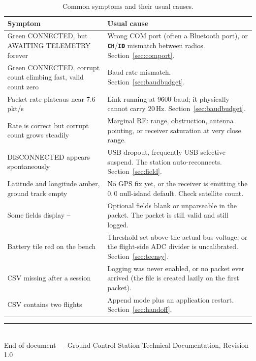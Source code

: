 \documentclass[11pt,a4paper]{article}
\newcommand{\code}[1]{\texttt{#1}}
\newcommand{\param}[1]{\textbf{\texttt{#1}}}
\begin{document}
\begin{table}[htbp]
\centering
\caption{Common symptoms and their usual causes.}
\label{tab:symptoms}
\small
\begin{tabularx}{\textwidth}{@{}p{52mm}X@{}}
\toprule
\textbf{Symptom} & \textbf{Usual cause}\\
\midrule
Green \textsf{CONNECTED}, but \textsf{AWAITING TELEMETRY} forever & Wrong COM port (often a Bluetooth port), or \param{CH}/\param{ID} mismatch between radios. Section~\ref{sec:comport}.\\
Green \textsf{CONNECTED}, corrupt count climbing fast, valid count zero & Baud rate mismatch. Section~\ref{sec:baudbudget}.\\
Packet rate plateaus near 7.6\,pkt/s & Link running at 9600 baud; it physically cannot carry 20\,Hz. Section~\ref{sec:baudbudget}.\\
Rate is correct but corrupt count grows steadily & Marginal RF: range, obstruction, antenna pointing, or receiver saturation at very close range.\\
\textsf{DISCONNECTED} appears spontaneously & USB dropout, frequently USB selective suspend. The station auto-reconnects. Section~\ref{sec:field}.\\
Latitude and longitude amber, ground track empty & No GPS fix yet, or the receiver is emitting the $0,0$ null-island default. Check satellite count.\\
Some fields display \code{--} & Optional fields blank or unparseable in the packet. The packet is still valid and still logged.\\
Battery tile red on the bench & Threshold set above the actual bus voltage, or the flight-side ADC divider is uncalibrated. Section~\ref{sec:teensy}.\\
CSV missing after a session & Logging was never enabled, or no packet ever arrived (the file is created lazily on the first packet).\\
CSV contains two flights & Append mode plus an application restart. Section~\ref{sec:handoff}.\\
\bottomrule
\end{tabularx}
\end{table}

\vfill
\begin{center}
\textcolor{gcsgrey}{\rule{0.5\textwidth}{0.4pt}}\\[2mm]
{\small\sffamily\textcolor{gcsgrey}{End of document --- Ground Control Station Technical Documentation, Revision 1.0}}
\end{center}
\end{document}
